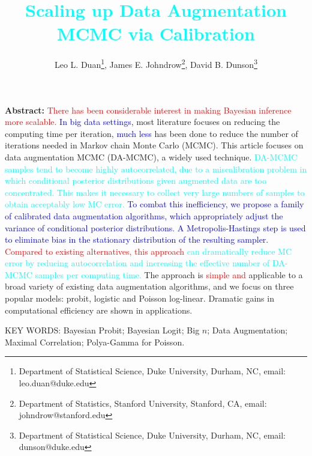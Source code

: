 \documentclass[11pt]{article}
\newcommand{\leojames}[1]{\textcolor{blue}{#1}}
\newcommand{\leo}[1]{{\textcolor{red}{#1}}}
\newcommand{\dave}[1]{{\textcolor{cyan}{#1}}}
\begin{document}
\title{\dave{Scaling up Data Augmentation MCMC via Calibration}}



\author{ Leo L. Duan\thanks{Department of Statistical Science, Duke University, Durham, NC, email: leo.duan@duke.edu},
     James E. Johndrow\thanks{Department of Statistics, Stanford University, Stanford, CA, email: johndrow@stanford.edu},
     David B. Dunson\thanks{Department of Statistical Science, Duke University, Durham, NC, email: dunson@duke.edu}
     }

\editor{}
\maketitle


{\bf Abstract:} 
\leo{There has been considerable interest in making Bayesian inference more scalable.}
\leojames{In big data settings},  most literature focuses on reducing the computing time per iteration, \leojames{much less} has been 
done to reduce the number of iterations needed in Markov chain Monte Carlo (MCMC). This article focuses on data augmentation MCMC (DA-MCMC), a widely used technique. \dave{DA-MCMC samples tend to become highly autocorrelated, due to a miscalibration problem in which conditional posterior distributions given augmented data are too concentrated.  This makes it necessary to collect very large numbers of samples to obtain acceptably low MC error.} \leojames{To combat this inefficiency, we propose a family of calibrated data augmentation algorithms, which appropriately adjust the variance of conditional posterior distributions. A Metropolis-Hastings step is used to eliminate bias in the stationary distribution of the resulting sampler}. \leo{Compared to existing alternatives, this approach} \dave{can dramatically reduce MC error by reducing autocorrelation and increasing the effective number of DA-MCMC samples per computing time.} The approach is \leo{simple and}  applicable to a broad variety of existing data augmentation algorithms, and we focus on three popular models: probit, logistic and Poisson log-linear.  Dramatic gains in computational efficiency are shown in applications.
\vskip 12pt 

{\noindent  KEY WORDS:   Bayesian Probit; Bayesian Logit; Big $n$; Data Augmentation; Maximal Correlation; Polya-Gamma for Poisson.}
\end{document}
